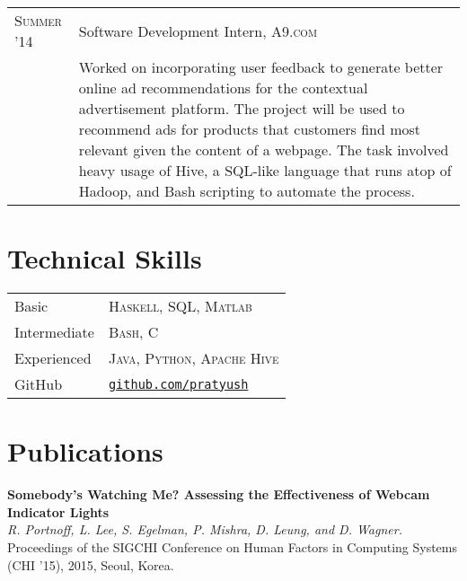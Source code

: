 \documentclass[letter,10pt]{article}
\begin{document}
\begin{tabular}{R{2.5cm}p{13cm}}
  \textsc{Summer '14}     & Software Development Intern, \textsc{A9.com}\\

                          &\footnotesize{
                             Worked on incorporating user feedback to generate
                             better online ad recommendations for the
                             contextual advertisement platform. The project
                             will be used to recommend ads for products that
                             customers find most relevant given the content of
                             a webpage. The task involved heavy usage of Hive,
                             a SQL-like language that runs atop of Hadoop, and
                             Bash scripting to automate the process.
                            }
\end{tabular}

\section{Technical Skills}
\begin{tabular}{R{2.5cm}l}
  Basic         & \textsc{Haskell}, \textsc{SQL}, \textsc{Matlab}\\
  Intermediate  & \textsc{Bash, C}\\
  Experienced   & \textsc{Java, Python, Apache Hive}\\
  GitHub        & \href{https://www.github.com/pratyush}{\texttt{github.com/pratyush}}
\end{tabular}

\section{Publications}
\textbf{Somebody's Watching Me? Assessing the Effectiveness of Webcam Indicator Lights}\\
\textit{R. Portnoff, L. Lee, S. Egelman, P. Mishra, D. Leung, and D. Wagner.}
Proceedings of the SIGCHI Conference on Human Factors in Computing Systems (CHI
’15), 2015, Seoul, Korea.
\end{document}
